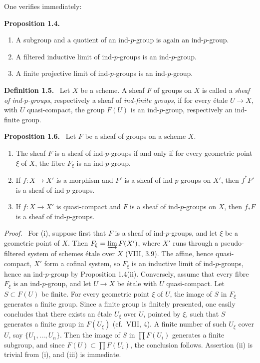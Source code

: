 \documentclass[11pt]{article}
\newcommand{\cf}{cf.\ }
\newenvironment{statement}[1]{\par\medskip\noindent\textbf{#1.}\ }{\par\medskip}
\newenvironment{prooftext}{\par\noindent\emph{Proof.}\ }{\par\medskip}
\begin{document}
One verifies immediately:

\begin{statement}{Proposition 1.4}
\begin{enumerate}[label=(\roman*)]
\item A subgroup and a quotient of an ind-\(p\)-group is again an ind-\(p\)-group.
\item A filtered inductive limit of ind-\(p\)-groups is an ind-\(p\)-group.
\item A finite projective limit of ind-\(p\)-groups is an ind-\(p\)-group.
\end{enumerate}
\end{statement}

\begin{statement}{Definition 1.5}
Let \(X\) be a scheme. A sheaf \(F\) of groups on \(X\) is called a \emph{sheaf of ind-\(p\)-groups}, respectively a sheaf of \emph{ind-finite groups}, if for every \'etale \(U\to X\), with \(U\) quasi-compact, the group \(F(U)\) is an ind-\(p\)-group, respectively an ind-finite group.
\end{statement}

\begin{statement}{Proposition 1.6}
Let \(F\) be a sheaf of groups on a scheme \(X\).
\begin{enumerate}[label=(\roman*)]
\item The sheaf \(F\) is a sheaf of ind-\(p\)-groups if and only if for every geometric point \(\xi\) of \(X\), the fibre \(F_\xi\) is an ind-\(p\)-group.
\item If \(f:X\to X'\) is a morphism and \(F'\) is a sheaf of ind-\(p\)-groups on \(X'\), then \(f^*F'\) is a sheaf of ind-\(p\)-groups.
\item If \(f:X\to X'\) is quasi-compact and \(F\) is a sheaf of ind-\(p\)-groups on \(X\), then \(f_*F\) is a sheaf of ind-\(p\)-groups.
\end{enumerate}
\end{statement}

\begin{prooftext}
For (i), suppose first that \(F\) is a sheaf of ind-\(p\)-groups, and let \(\xi\) be a geometric point of \(X\). Then \(F_\xi=\varinjlim F(X')\), where \(X'\) runs through a pseudo-filtered system of schemes \'etale over \(X\) (VIII, 3.9). The affine, hence quasi-compact, \(X'\) form a cofinal system, so \(F_\xi\) is an inductive limit of ind-\(p\)-groups, hence an ind-\(p\)-group by Proposition 1.4(ii). Conversely, assume that every fibre \(F_\xi\) is an ind-\(p\)-group, and let \(U\to X\) be \'etale with \(U\) quasi-compact. Let \(S\subset F(U)\) be finite. For every geometric point \(\xi\) of \(U\), the image of \(S\) in \(F_\xi\) generates a finite group. Since a finite group is finitely presented, one easily concludes that there exists an \'etale \(U_\xi\) over \(U\), pointed by \(\xi\), such that \(S\) generates a finite group in \(F(U_\xi)\) (\cf VIII, 4). A finite number of such \(U_\xi\) cover \(U\), say \(\{U_1,\ldots,U_n\}\). Then the image of \(S\) in \(\prod F(U_i)\) generates a finite subgroup, and since \(F(U)\subset\prod F(U_i)\), the conclusion follows. Assertion (ii) is trivial from (i), and (iii) is immediate.
\end{prooftext}
\end{document}
